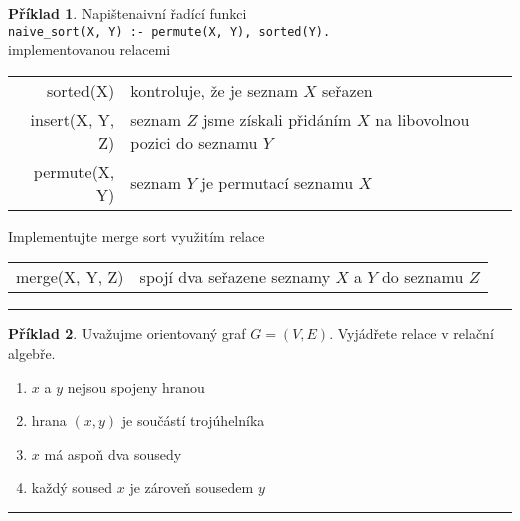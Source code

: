 \documentclass[a4paper]{article}
\theoremstyle{definition}
\newtheorem{priklad}{Příklad}
\begin{document}
\begin{priklad}
    Napištenaivní řadící funkci\\
    \quad \texttt{naive\_sort(X, Y) :- permute(X, Y), sorted(Y).}\\
    implementovanou relacemi
    
    \begin{table}[htb]
      \begin{center}
        \begin{tabular}{r@{\qquad}l}
           sorted(X) & kontroluje, že je seznam $ X $ seřazen \\
           insert(X, Y, Z) & seznam $ Z $ jsme získali přidáním $ X $ na libovolnou pozici do seznamu $ Y $ \\
           permute(X, Y) & seznam $ Y $ je permutací seznamu $ X $
        \end{tabular}
      \end{center}
    \end{table}
    
    Implementujte merge sort využitím relace
    
    \begin{table}[htb]
      \begin{center}
        \begin{tabular}{r@{\qquad}l}
           merge(X, Y, Z) & spojí dva seřazene seznamy $ X $ a $ Y $ do seznamu $ Z $
        \end{tabular}
      \end{center}
    \end{table}
    
\noindent\rule{\linewidth}{.2pt}    
\end{priklad}

\begin{priklad}
    Uvažujme orientovaný graf $ G = (V,E) $. Vyjádřete relace v relační algebře.
    
    \begin{enumerate}
      \item $ x $ a $ y $ nejsou spojeny hranou
      \item hrana $ (x,y) $ je součástí trojúhelníka
      \item $ x $ má aspoň dva sousedy
      \item každý soused $ x $ je zároveň sousedem $ y $
    \end{enumerate}
    
\noindent\rule{\linewidth}{.2pt}    
\end{priklad}
\end{document}
